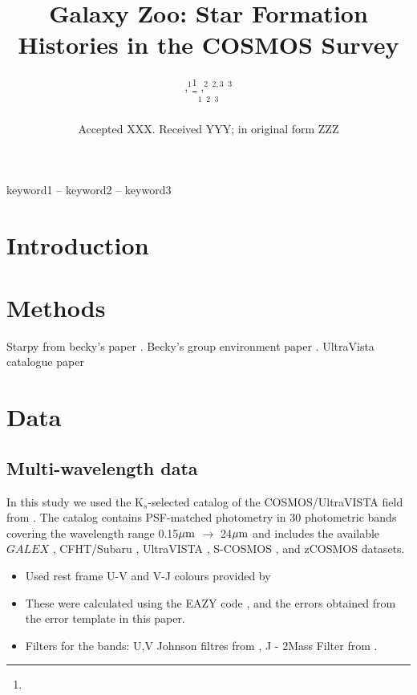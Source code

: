 \documentclass[a4paper,fleqn,usenatbib]{mnras}
\title[COSMOS SFHs]{Galaxy Zoo: Star Formation Histories in the COSMOS Survey}
\author[]{
,$^{1}$\thanks{}
,$^{2}$
$^{2,3}$
$^{3}$
\\
$^{1}$
$^{2}$
$^{3}$
}
\date{Accepted XXX. Received YYY; in original form ZZZ}
\begin{document}
\label{firstpage}
\pagerange{\pageref{firstpage}--\pageref{lastpage}}
\maketitle

\begin{abstract}


\end{abstract}

\begin{keywords}
keyword1 -- keyword2 -- keyword3
\end{keywords}



\section{Introduction}

\section{Methods}

Starpy from becky's paper \cite{smethurst2015galaxy}.
Becky's group environment paper \cite{smethurst2017galaxy}.
UltraVista catalogue paper \cite{muzzin2013public}
\section{Data}
   
   \subsection{Multi-wavelength data}
   
   In this study we used the K$_{s}$-selected catalog of the COSMOS/UltraVISTA field from \cite{muzzin2013public}.  
   The catalog contains PSF-matched photometry in 30 photometric bands covering the wavelength range 0.15$\hbox{$\mu$m}$ 
   $\rightarrow$ 24$\hbox{$\mu$m}$ and includes the available $GALEX$ \citep{martin2005}, CFHT/Subaru \citep{capak2007}, 
   UltraVISTA \citep{mcCraken2012}, S-COSMOS \citep{sanders2007}, and zCOSMOS \citep{lilly2009} datasets.

   \begin{itemize}
   
   \item Used rest frame U-V and V-J colours provided by \cite{muzzin2013public}
   \item These were calculated using the \textsc{EAZY} code \cite{eazycode}, and the errors obtained from the error template in this paper.
   \item Filters for the bands: U,V Johnson filtres from \cite{maiz2006}, J - 2Mass Filter from \cite{2mass2006}.
   \end{itemize}
\end{document}
